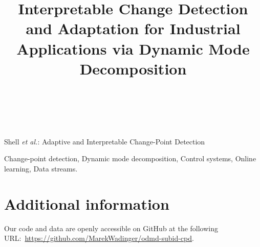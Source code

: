 \documentclass[journal]{IEEEtran}
\begin{document}
\title{Interpretable Change Detection and Adaptation for Industrial Applications via Dynamic Mode Decomposition}

\author{ \\
 \\
}

%
{Shell \MakeLowercase{\textit{et al.}}: Adaptive and Interpretable Change-Point Detection}

\IEEEpubid{}

\maketitle

\begin{abstract}

\end{abstract}

\begin{IEEEkeywords}
Change-point detection, Dynamic mode decomposition, Control systems, Online learning, Data streams.
\end{IEEEkeywords}

\linenumbers{}







% 









\section*{Additional information}
Our code and data are openly accessible on GitHub at the following URL:~\url{https://github.com/MarekWadinger/odmd-subid-cpd}.
\end{document}

